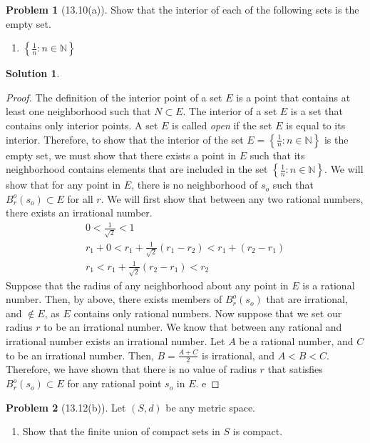 \documentclass[12pt]{article}
\theoremstyle{definition} %
\newtheorem{solution}{Solution}
\newtheorem{problem}{Problem}
\theoremstyle{plain} %
\begin{document}
\begin{problem}[13.10(a)]
Show that the interior of each of the following sets is the empty set.
\begin{enumerate}
    \item $\left\{ \frac{1}{n}:n\in\mathbb{{N}}  \right\} $ 
\end{enumerate}
\end{problem}

\begin{solution}
   \begin{proof}
    The definition of the interior point of a set $E$ is a point that contains at least one neighborhood such that $N\subset E$. The interior of a set $E$ is a set that contains only interior points. A set $E$ is called \emph{open} if the set $E$ is equal to its interior. Therefore, to show that the interior of the set $E=\left\{ \frac{1}{n}:n\in \mathbb{{N}}  \right\} $ is the empty set, we must show that there exists a point in $E$ such that its neighborhood
    contains elements that are included in the set $\left\{ \frac{1}{n}:n\in\mathbb{{N}}  \right\}$. 
    We will show that for any point in $E$, there is no neighborhood of $s_{o} $ such that $B_{r}^{o}(s_{o} )\subset E $ for all $r$. We will first show that between any two rational numbers, there exists an irrational number.
    \begin{align}
        0<\frac{1}{\sqrt{2} }<1 \\[10pt] 
        r_{1} + 0 < r_{1} + \frac{1}{\sqrt{2} }(r_{1} -r_{2} )<r_{1} +(r_{2} -r_{1} )\\[10pt] 
        r_{1} <r_{1} +\frac{1}{\sqrt{2} }(r_{2} -r_{1} )<r_{2}
    \end{align}
    Suppose that the radius of any neighborhood about any point in $E$ is a rational number. Then, by above, there exists members of $B_{r}^{o}(s_{o} )$ that are irrational, and $\notin E $, as $E$ contains only rational numbers. Now suppose that we set our radius $r$ to be an irrational number. We know that between any rational and irrational number exists an irrational number. Let $A$  be a rational number, and $C$  to be an irrational number. Then, $B=\frac{A+C}{2}$ is irrational, and $A<B<C$. Therefore, we have shown that there is no value of radius $r$ that satisfies $B_{r}^{o}(s_{o} )\subset E$ for any rational point $s_{o} $ in $E$.  e
   \end{proof} 
\end{solution}

\begin{problem}[13.12(b)]   
Let $(S,d)$ be any metric space.
\begin{enumerate}
    \item Show that the finite union of compact sets in $S$ is compact.
\end{enumerate}
\end{problem}
\end{document}
